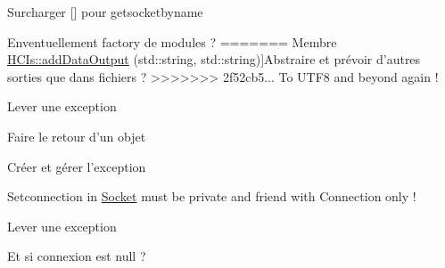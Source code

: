 
\begin{DoxyRefList}
\item[\label{todo__todo000002}%
\hypertarget{todo__todo000002}{}%
Membre \hyperlink{classBatteryModule_a2fb494ef5f124c38c0fdf9ccfb31918f}{Battery\-Module\-:\-:Battery\-Module} (std\-::string name, Params params=Params())]Surcharger \mbox{[}\mbox{]} pour getsocketbyname  
\item[\label{todo__todo000004}%
\hypertarget{todo__todo000004}{}%
<<<<<<< HEAD
Classe \hyperlink{classISynchronized}{I\-Synchronized} ]Enventuellement factory de modules ?  
=======
Membre \hyperlink{classHCIs_afeb0ee7efd2c14dfded566aacb9dc615}{H\-C\-Is\-:\-:add\-Data\-Output} (std\-::string, std\-::string)]Abstraire et prévoir d'autres sorties que dans fichiers ?  
>>>>>>> 2f52cb5... To UTF8 and beyond again !
\item[\label{todo__todo000005}%
\hypertarget{todo__todo000005}{}%
Membre \hyperlink{classModule_ab7ea9648fa500696c85e93ebd0666390}{Module\-:\-:clock} (int)]Lever une exception  
\item[\label{todo__todo000006}%
\hypertarget{todo__todo000006}{}%
Membre \hyperlink{classModule_aed844ffed911793d3895c5a2bc4f9d43}{Module\-:\-:get\-Socket\-By\-Name} (std\-::string)]Faire le retour d'un objet 

Créer et gérer l'exception  
\item[\label{todo__todo000011}%
\hypertarget{todo__todo000011}{}%
Classe \hyperlink{classSocket}{Socket} ]Setconnection in \hyperlink{classSocket}{Socket} must be private and friend with Connection only !  
\item[\label{todo__todo000010}%
\hypertarget{todo__todo000010}{}%
Membre \hyperlink{classSocket_a71e162a0ca00b1a46fe23eaccb09f76d}{Socket\-:\-:get\-First\-Message} ()]Lever une exception  
\item[\label{todo__todo000009}%
\hypertarget{todo__todo000009}{}%
Membre \hyperlink{classSocket_a06b687baf9b01f3e399a5ee040ca04e4}{Socket\-:\-:send} (std\-::shared\-\_\-ptr$<$ Message $>$)]Et si connexion est null ? 
\end{DoxyRefList}